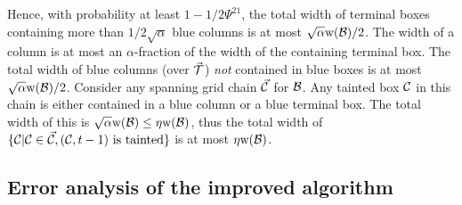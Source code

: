\documentclass{acmsmall}
\newcommand{\cB}{{\cal B}}
\newcommand{\cC}{{\cal C}}
\newcommand{\cT}{{\cal T}}
\newcommand{\suff}{{21}}
\newcommand{\taint}{\eta}
\newcommand{\prob}{{\rm Prob}}
\newcommand{\width}{{\bf {\rm  w}}}
\newcommand{\gridprec}{\alpha}
\newcommand{\errorcont}{\Psi}
\newcommand{\buildgrid}{{\rm {\bf BuildGrid}}}
\newcommand{\gridchain}{{\rm {\bf GridChain}}}
\begin{document}
Hence, with probability at least $1 - 1/2\errorcont^{\suff}$, the total width of terminal boxes
containing more than $1/2\sqrt{\gridprec}$ blue columns is at most $\sqrt{\gridprec}\width(\cB)/2$.
The width of a column is at most an $\gridprec$-fraction of the width of the containing terminal box.
The total width of blue columns (over $\vec{\cT}$) \emph{not} contained in blue boxes is at most $\sqrt{\gridprec}\width(\cB)/2$.
Consider any spanning grid chain $\vec{\cC}$ for $\cB$. Any tainted box $\cC$ in this chain is either contained
in a blue column or a blue terminal box. The total width of this is $\sqrt{\gridprec}\width(\cB) \leq \taint \width(\cB)$,
thus the
total width of $\{\cC | \cC \in \vec{\cC}, \textrm{$(\cC,t-1)$ is tainted}\}$ is at most $\taint \width(\cB)$.
%
%
%
%
\fi

\subsection{Error analysis of the improved algorithm}
\label{subsec:revised error}
\end{document}
